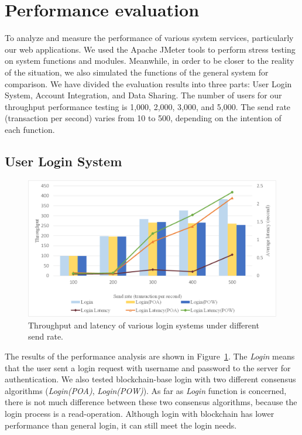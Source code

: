 \section{Performance evaluation}
To analyze and measure the performance of various system services, particularly our web applications. We used the Apache JMeter tools to perform stress testing on system functions and modules. Meanwhile, in order to be closer to the reality of the situation, we also simulated the functions of the general system for comparison. We have divided the evaluation results into three parts: User Login System, Account Integration, and Data Sharing. The number of users for our throughput performance testing is 1,000, 2,000, 3,000, and 5,000. The send rate (transaction per second) varies from 10 to 500, depending on the intention of each function.


\subsection*{User Login System}
\begin{figure}[htb]
    \centering
    \includegraphics[height=!,width=1\linewidth,keepaspectratio=true]{figures/login-throughput-latency.png}
    \caption{{\footnotesize Throughput and latency of various login systems under different send rate.}}
    \label{fig:loginThroughput}
\end{figure}
The results of the performance analysis are shown in Figure~\ref{fig:loginThroughput}. The \textit{Login} means that the user sent a login request with username and password to the server for authentication. We also tested blockchain-base login with two different consensus algorithms (\textit{Login(POA)}, \textit{Login(POW)}). As far as \textit{Login} function is concerned, there is not much difference between these two consensus algorithms, because the login process is a read-operation. Although login with blockchain has lower performance than general login, it can still meet the login needs.
\newpage

